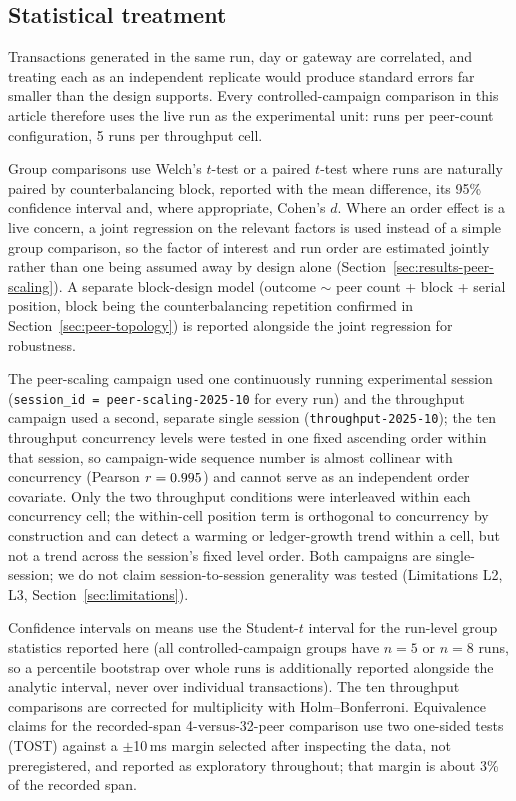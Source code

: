 \subsection{Statistical treatment}
\label{sec:stats-treatment}

Transactions generated in the same run, day or gateway are correlated, and treating each as an independent replicate would produce standard errors far smaller than the design supports. Every controlled-campaign comparison in this article therefore uses the live run as the experimental unit: \PeerRunsPerConfig{} runs per peer-count configuration, 5 runs per throughput cell.

Group comparisons use Welch's $t$-test or a paired $t$-test where runs are naturally paired by counterbalancing block, reported with the mean difference, its 95\% confidence interval and, where appropriate, Cohen's $d$. Where an order effect is a live concern, a joint regression on the relevant factors is used instead of a simple group comparison, so the factor of interest and run order are estimated jointly rather than one being assumed away by design alone (Section~\ref{sec:results-peer-scaling}). A separate block-design model (outcome $\sim$ peer count + block + serial position, block being the counterbalancing repetition confirmed in Section~\ref{sec:peer-topology}) is reported alongside the joint regression for robustness.

The peer-scaling campaign used one continuously running experimental session (\texttt{session\_id = peer-scaling-2025-10} for every run) and the throughput campaign used a second, separate single session (\texttt{throughput-2025-10}); the ten throughput concurrency levels were tested in one fixed ascending order within that session, so campaign-wide sequence number is almost collinear with concurrency (Pearson $r = 0.995$) and cannot serve as an independent order covariate. Only the two throughput conditions were interleaved within each concurrency cell; the within-cell position term is orthogonal to concurrency by construction and can detect a warming or ledger-growth trend within a cell, but not a trend across the session's fixed level order. Both campaigns are single-session; we do not claim session-to-session generality was tested (Limitations L2, L3, Section~\ref{sec:limitations}).

Confidence intervals on means use the Student-$t$ interval for the run-level group statistics reported here (all controlled-campaign groups have $n = 5$ or $n = 8$ runs, so a percentile bootstrap over whole runs is additionally reported alongside the analytic interval, never over individual transactions). The ten throughput comparisons are corrected for multiplicity with Holm--Bonferroni. Equivalence claims for the recorded-span 4-versus-32-peer comparison use two one-sided tests (TOST) against a $\pm$10\,ms margin selected after inspecting the data, not preregistered, and reported as exploratory throughout; that margin is about 3\% of the recorded span.

